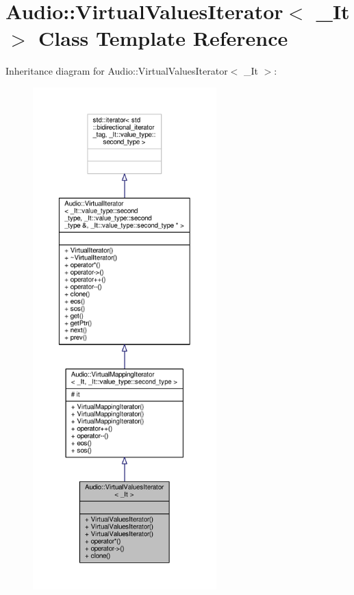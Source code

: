\hypertarget{classAudio_1_1VirtualValuesIterator}{}\section{Audio\+:\+:Virtual\+Values\+Iterator$<$ \+\_\+\+It $>$ Class Template Reference}
\label{classAudio_1_1VirtualValuesIterator}


Inheritance diagram for Audio\+:\+:Virtual\+Values\+Iterator$<$ \+\_\+\+It $>$\+:
\nopagebreak
\begin{figure}[H]
\begin{center}
\leavevmode
\includegraphics[height=550pt]{de/d64/classAudio_1_1VirtualValuesIterator__inherit__graph}
\end{center}
\end{figure}


